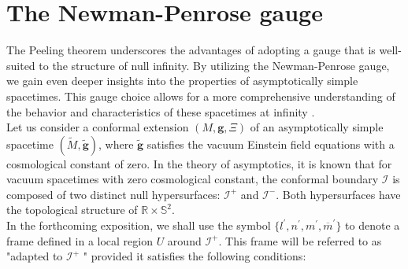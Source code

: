 \section{The Newman-Penrose gauge}
\label{sec:The Newman-Penrose gauge}

The Peeling theorem underscores the advantages of adopting a gauge that is well-suited to the structure of null infinity. By utilizing the Newman-Penrose gauge, we gain even deeper insights into the properties of asymptotically simple spacetimes. This gauge choice allows for a more comprehensive understanding of the behavior and characteristics of these spacetimes at infinity \cite{Val16}. \\

Let us consider a conformal extension $(M, \boldsymbol{g}, \Xi)$ of an asymptotically simple spacetime $(\tilde{M}, \tilde{\boldsymbol{g}})$, where $\tilde{\boldsymbol{g}}$ satisfies the vacuum Einstein field equations with a cosmological constant of zero. In the theory of asymptotics, it is known that for vacuum spacetimes with zero cosmological constant, the conformal boundary $\mathscr{I}$ is composed of two distinct null hypersurfaces: $\mathscr{I}^+$ and $\mathscr{I}^-$. Both hypersurfaces have the topological structure of $\mathbb{R} \times  \mathbb{S}^2$.\\

In the forthcoming exposition, we shall use the symbol $\{l^{\prime}, n^{\prime}, m^{\prime}, \overline{m}^{\prime}\}$ to denote a frame defined in a local region $U$ around $\mathscr{I}^+$. This frame will be referred to as "adapted to $\mathscr{I}^+$ " provided it satisfies the following conditions:

